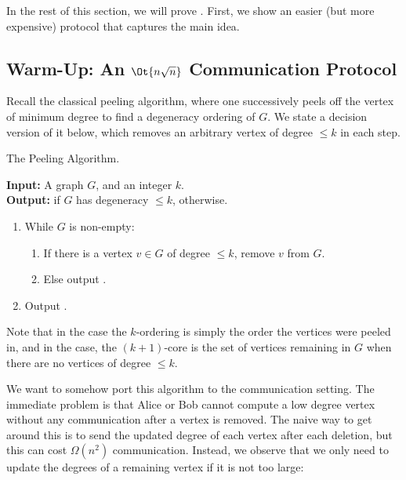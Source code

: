 In the rest of this section, we will prove .
First, we show an easier (but more expensive) protocol that captures the main
idea.

\subsection{Warm-Up: An \texorpdfstring{$\Ot{n\sqrt{n}}$}{Õ(n sqrt n)} Communication Protocol}\label{sec:nrootn}
Recall the classical peeling algorithm, where one successively peels off the
vertex of minimum degree to find a degeneracy ordering of $G$.
We state a decision version of it below, which removes an arbitrary vertex of
degree $\leq k$ in each step.

\begin{Algorithm}\label{alg:peeling}
  The Peeling Algorithm. \medskip

  \textbf{Input:} A graph $G$, and an integer $k$.\\
  \textbf{Output:} \true{} if $G$ has degeneracy $\leq k$, \fail{} otherwise.

  \begin{enumerate}
    \item While $G$ is non-empty:
      \begin{enumerate}
        \item If there is a vertex $v \in G$ of degree $\leq k$,
          remove $v$ from $G$.
        \item Else output \fail.
      \end{enumerate}
    \item Output \true.
  \end{enumerate}
\end{Algorithm}

Note that in the \true{} case the $k$-ordering is simply the order the vertices
were peeled in, and in the \fail{} case, the $(k + 1)$-core is the set of vertices
remaining in $G$ when there are no vertices of degree $\leq k$.

We want to somehow port this algorithm to the communication setting.
The immediate problem is that Alice or Bob cannot compute a low degree
vertex without any communication after a vertex is removed.
The naive way to get around this is to send the updated degree of each
vertex after each deletion, but this can cost $\Omega(n^2)$ communication.
Instead, we observe that we only need to update the degrees of a remaining
vertex if it is not too large:

